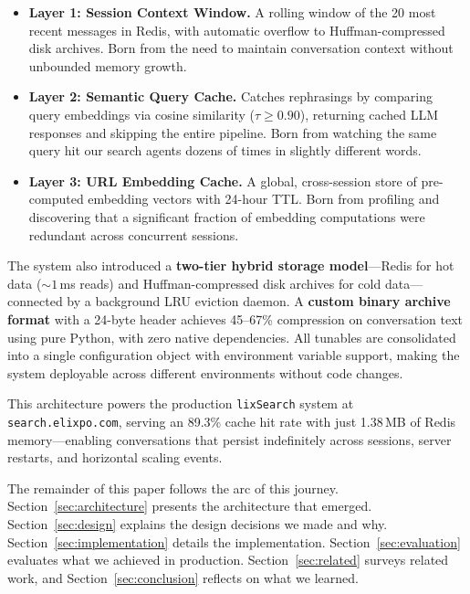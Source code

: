 \documentclass[conference]{IEEEtran}
\begin{document}
\begin{itemize}
\item \textbf{Layer 1: Session Context Window.} A rolling window of the 20 most recent messages in Redis, with automatic overflow to Huffman-compressed disk archives. Born from the need to maintain conversation context without unbounded memory growth.
\item \textbf{Layer 2: Semantic Query Cache.} Catches rephrasings by comparing query embeddings via cosine similarity ($\tau \geq 0.90$), returning cached LLM responses and skipping the entire pipeline. Born from watching the same query hit our search agents dozens of times in slightly different words.
\item \textbf{Layer 3: URL Embedding Cache.} A global, cross-session store of pre-computed embedding vectors with 24-hour TTL. Born from profiling and discovering that a significant fraction of embedding computations were redundant across concurrent sessions.
\end{itemize}

The system also introduced a \textbf{two-tier hybrid storage model}---Redis for hot data (${\sim}1$\,ms reads) and Huffman-compressed disk archives for cold data---connected by a background LRU eviction daemon. A \textbf{custom binary archive format} with a 24-byte header achieves 45--67\% compression on conversation text using pure Python, with zero native dependencies. All tunables are consolidated into a single configuration object with environment variable support, making the system deployable across different environments without code changes.

This architecture powers the production \texttt{lixSearch} system at \texttt{search.elixpo.com}, serving an 89.3\% cache hit rate with just 1.38\,MB of Redis memory---enabling conversations that persist indefinitely across sessions, server restarts, and horizontal scaling events.

The remainder of this paper follows the arc of this journey. Section~\ref{sec:architecture} presents the architecture that emerged. Section~\ref{sec:design} explains the design decisions we made and why. Section~\ref{sec:implementation} details the implementation. Section~\ref{sec:evaluation} evaluates what we achieved in production. Section~\ref{sec:related} surveys related work, and Section~\ref{sec:conclusion} reflects on what we learned.

\end{document}
